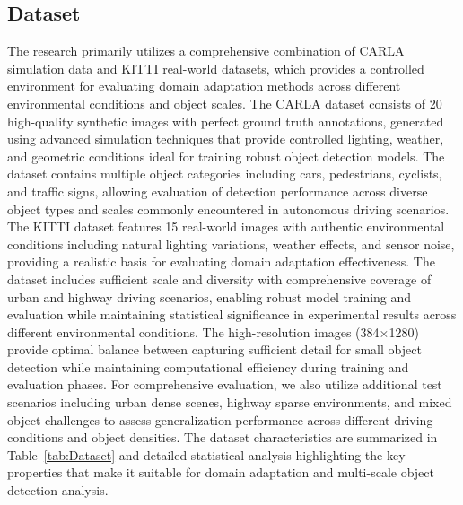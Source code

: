 \documentclass[conference]{IEEEtran}
\begin{document}
\subsection{Dataset}
The research primarily utilizes a comprehensive combination of CARLA simulation data and KITTI real-world datasets, which provides a controlled environment for evaluating domain adaptation methods across different environmental conditions and object scales.
The CARLA dataset consists of 20 high-quality synthetic images with perfect ground truth annotations, generated using advanced simulation techniques that provide controlled lighting, weather, and geometric conditions ideal for training robust object detection models.
The dataset contains multiple object categories including cars, pedestrians, cyclists, and traffic signs, allowing evaluation of detection performance across diverse object types and scales commonly encountered in autonomous driving scenarios.
The KITTI dataset features 15 real-world images with authentic environmental conditions including natural lighting variations, weather effects, and sensor noise, providing a realistic basis for evaluating domain adaptation effectiveness.
The dataset includes sufficient scale and diversity with comprehensive coverage of urban and highway driving scenarios, enabling robust model training and evaluation while maintaining statistical significance in experimental results across different environmental conditions.
The high-resolution images (384×1280) provide optimal balance between capturing sufficient detail for small object detection while maintaining computational efficiency during training and evaluation phases.
For comprehensive evaluation, we also utilize additional test scenarios including urban dense scenes, highway sparse environments, and mixed object challenges to assess generalization performance across different driving conditions and object densities.
The dataset characteristics are summarized in Table~\ref{tab:Dataset} and detailed statistical analysis highlighting the key properties that make it suitable for domain adaptation and multi-scale object detection analysis.
\end{document}
